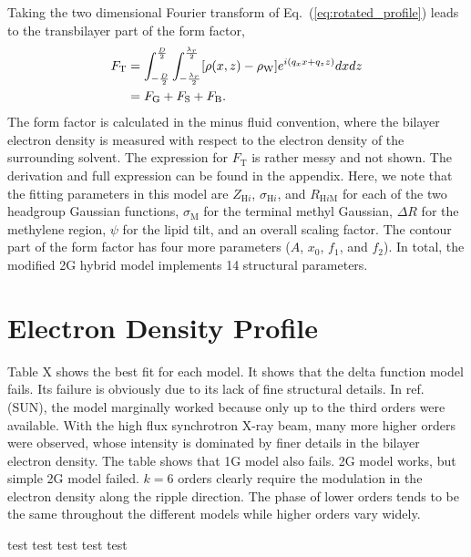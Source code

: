 \documentclass[12pt,letterpaper]{article}
\newcommand{\zh}[1]{Z_{\mathrm{H}#1}}
\newcommand{\sigmah}[1]{\sigma_{\mathrm{H}#1}}
\newcommand{\sigmam}{\sigma_\mathrm{M}}
\newcommand{\rhow}{\rho_\mathrm{W}}
\newcommand{\Rhm}[1]{R_{\mathrm{H}#1\mathrm{M}}}
\begin{document}
Taking the two dimensional Fourier transform of Eq.~(\ref{eq:rotated_profile})
leads to the transbilayer part of the form factor,
\begin{align}
  F_\mathrm{T} 
  &= \int_{-\frac{D}{2}}^{\frac{D}{2}} \int_{-\frac{\lambda_r}{2}}^{\frac{\lambda_r}{2}} 
     \bracks{\rho(x,z)-\rhow} e^{i(q_xx+q_zz)} dxdz \\
  &= F_\mathrm{G} + F_\mathrm{S} + F_\mathrm{B}.
\end{align}
The form factor is calculated in the minus fluid convention, 
where the bilayer electron density
is measured with respect to the electron density of the surrounding solvent.
The expression for $F_\mathrm{T}$ is rather messy and not shown. 
The derivation and full expression can be found in the appendix. Here, 
we note that
the fitting parameters in this model are $\zh{i}$, $\sigmah{i}$, and 
$\Rhm{i}$ for each of the two headgroup Gaussian functions, $\sigmam$ for
the terminal methyl Gaussian, $\Delta R$ for the methylene region, $\psi$ for
the lipid tilt, and an overall scaling factor. The contour part of the 
form factor has four more parameters ($A$, $x_0$, $f_1$, and $f_2$).
In total, the modified 2G hybrid model implements 14 structural parameters.


\section{Electron Density Profile}
Table X shows the best fit for each model. It shows that the delta function
model fails. Its failure is obviously due to its lack of fine structural 
details. In ref. (SUN), the model marginally worked because only up to
the third orders were available. With the high flux synchrotron X-ray beam,
many more higher orders were observed, whose intensity is dominated by
finer details in the bilayer electron density. The table shows that
1G model also fails. 2G model works, but simple 2G model failed. $k=6$ orders
clearly require the modulation in the electron density along the ripple 
direction. The phase of lower orders tends to be the same throughout
the different models while higher orders vary widely. 


test
test
test
test
test


\appendix
\end{document}
